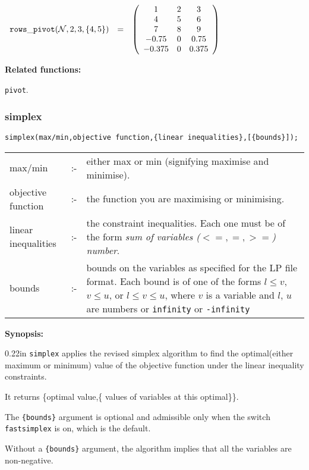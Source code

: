 \begin{flushleft}  
\hspace*{0.1in}
\begin{math}  
\begin{array}{ccc}
{\tt rows\_pivot}({\cal N},2,3,\{4,5\}) & = & \left( \begin{array}
{c c c}1 & 2 & 3 \\ 4 & 5 & 6 \\ 7 & 8 & 9 \\ -0.75 & 0 & 0.75 \\ 
-0.375 & 0 & 0.375 
 \end{array} \right) 
\end{array}
\end{math}  
\end{flushleft}

{\bf Related functions:}

\hspace*{0.175in} {\tt pivot}.


\subsubsection{simplex}
\label{linalg:simplex}

\hspace*{0.175in} {\tt simplex(max/min,objective function,\{linear 
inequalities\},[\{bounds\}]);}

\hspace*{0.1in}  
\begin{tabular}{l l l} 
  max/min             & :- & \parbox[t]{.63\linewidth}{either max or min 
    (signifying maximise and minimise).} \\
  objective function  & :- & the function you are maximising or 
  minimising. \\
  linear inequalities & :- & \parbox[t]{.63\linewidth}{the constraint 
    inequalities. Each one must be of the form 
    {\it sum of variables ($<=,=,>=$) number}.}\\
  bounds & :- & \parbox[t]{.63\linewidth}{bounds on the variables as
    specified for the LP file format. Each bound is of one of the forms $l\leq
    v$, $v\leq u$, or $l\leq v\leq u$, where $v$ is a variable and $l$, $u$ are
    numbers or \texttt{infinity} or \texttt{-infinity}}
\end{tabular}

{\bf Synopsis:} %

\begin{addtolength}{\leftskip}{0.22in}
{\tt simplex} applies the revised simplex algorithm to find the 
optimal(either maximum or minimum) value of the objective function 
under the linear inequality constraints.

It returns \{optimal value,\{ values of variables at this optimal\}\}.

The \texttt{\{bounds\}} argument is optional and admissible only when the switch
\texttt{fastsimplex} is on, which is the default.

Without a \texttt{\{bounds\}} argument, the algorithm implies that all the
variables are non-negative.

\end{addtolength}

